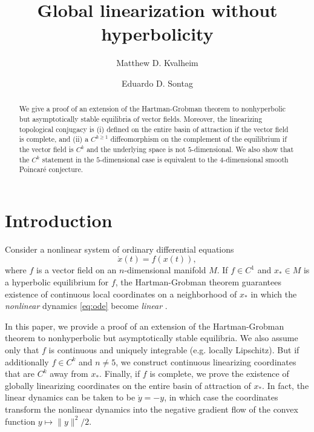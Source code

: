 \documentclass[11pt]{amsart}
\author{Matthew D. Kvalheim}
\author{Eduardo D. Sontag}
\title{Global linearization without hyperbolicity}
\theoremstyle{definition}
\begin{document}
	
	\begin{abstract}
We give a proof of an extension of the Hartman-Grobman theorem to nonhyperbolic but asymptotically stable equilibria of vector fields.
Moreover, the linearizing topological conjugacy is (i) defined on the entire basin of attraction if the vector field is complete, and (ii) a $C^{k\geq 1}$ diffeomorphism on the complement of the equilibrium if the vector field is $C^k$ and the underlying space is not $5$-dimensional.
We also show that  the $C^k$ statement in the $5$-dimensional case is equivalent to the $4$-dimensional smooth Poincar\'{e} conjecture.
	\end{abstract}
	
	\maketitle


\section{Introduction}\label{sec:intro}

Consider a nonlinear system of ordinary differential equations
\begin{equation}\label{eq:ode}
\dot{x}(t)=f(x(t)),	
\end{equation}
where $f$ is a vector field on an $n$-dimensional manifold $M$.
If $f\in C^1$ and $x_*\in M$ is a hyperbolic equilibrium for $f$, the Hartman-Grobman theorem guarantees existence of continuous local coordinates on a neighborhood of $x_*$ in which the \emph{nonlinear} dynamics \eqref{eq:ode} become \emph{linear} \cite{hartman1960lemma,grobman1959homeomorphism}.


In this paper, we provide a proof of an extension of the Hartman-Grobman theorem to nonhyperbolic but asymptotically stable equilibria.
We also assume only that $f$ is continuous and uniquely integrable (e.g. locally Lipschitz).
But if additionally $f\in C^k$ and $n\neq 5$, we construct continuous linearizing coordinates that are $C^k$ away from $x_*$.
Finally, if $f$ is complete, we prove the existence of globally linearizing coordinates on the entire basin of attraction of $x_*$.
In fact, the linear dynamics can be taken to be $\dot{y}=-y$, in which case the coordinates transform the nonlinear dynamics into the negative gradient flow of the convex function $y\mapsto \|y\|^2/2$.
\end{document}
